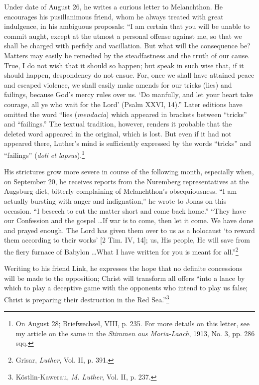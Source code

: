 Under date of August 26, he writes a curious letter to Melanchthon. He
encourages his pusillanimous friend, whom he always treated
with great indulgence, in his ambiguous proposals: “I am certain that
you will be unable to commit aught, except at the utmost a personal
offense against me, so that we shall be charged with perfidy and vacillation.
But what will the consequence be? Matters may easily be
remedied by the steadfastness and the truth of our cause. True, I do
not wish that it should so happen; but speak in such wise that, if it
should happen, despondency do not ensue. For, once we shall have
attained peace and escaped violence, we shall easily make amends for
our tricks (lies) and failings, because God’s mercy rules over us. ‘Do
manfully, and let your heart take courage, all ye who wait for the
Lord’ (Psalm XXVI, 14).” Later editions have omitted the word
“lies (\textit{mendacia}) which appeared in brackets between “tricks” and
“failings.” The textual tradition, however, renders it probable that
the deleted word appeared in the original, which is lost. But even if it
had not appeared there, Luther’s mind is sufficiently expressed by the
words “tricks” and “failings” (\textit{doli et lapsus}).\footnote
{On August 28; Briefwechsel, VIII, p. 235. For more details on this letter, see my
article on the same in the \textit{Stimmen aus Maria-Laach}, 1913, No. 3, pp. 286 sqq.}

His strictures grow more severe in course of the following month,
especially when, on September 20, he receives reports from the
Nuremberg representatives at the Augsburg diet, bitterly complaining
of Melanchthon’s obsequiousness. “I am actually bursting with anger
and indignation,” he wrote to Jonas on this occasion. “I beseech
to cut the matter short and come back home.” “They have our Confession
and the gospel \dots If war is to come, then let it come. We
have done and prayed enough. The Lord has given them over to us
as a holocaust ‘to reward them according to their works’ [2 Tim.
IV, 14]; us, His people, He will save from the fiery furnace of
Babylon \dots What I have written for you is meant for all.”\footnote{Grisar, \textit{Luther}, Vol. II, p. 391.}

Weriting to his friend Link, he expresses the hope that no definite
concessions will be made to the opposition; Christ will transform
all offers “into a lance by which to play a deceptive game with the
opponents who intend to play us false; Christ is preparing their destruction
in the Red Sea.”\footnote{Köstlin-Kawerau, \textit{M. Luther}, Vol. II, p. 237.}

